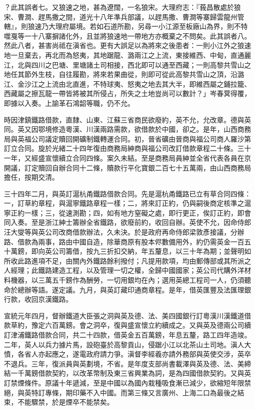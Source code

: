 \begin{pinyinscope}
？此其誤者七。又狼速之地，甚為遼闊，一名狼宋。大理府志：『莪昌散處於狼宋、曹澗、趕馬撒之間，道光十八年準兵部議，以趕馬撒、曹澗等寨歸雲龍州管轄』，則狼速乃大理府屬境。若如石道所勘，另尋一小江源至板廠山為界，則不特噬戛等一十八寨摒諸化外，且並將狼速地一帶地方亦概棄之不問矣。此其誤者八。然此八者，甚害尚祗在滇省也。更有大誤足以為將來之後患者：一則小江外之狼速地一旦棄去，再北而為怒夷，其地踞龍、潞兩江之上流，東接維西、中甸，直通麗江，北與四川之巴塘、里塘諸土司相接，西北即可以通至西藏；一則高黎共雪山之地任其節外生枝，自往履勘，將來若果曲從，則即可從此高黎共雪山之頂，沿潞江、金沙江之上流由北直進，不特球夷、怒夷之地去其大半，即維西屬之鋪拉籠、西藏屬之擦瓦龍一帶皆將被其所侵占，所失之土地豈尚可以數計？」岑春蓂得覆，即據以入奏。上諭革石鴻韶等職，仍不允。

時因津鎮鐵路借款，直隸、山東、江蘇三省商民欲廢約，英不允，允改章。德與英同。英又因鄂境修造粵漢、川漢兩路需款，欲借款於中國，卻之。是年，山西商務局與英福公司議定贖回開礦制鐵轉運合同。初，晉省礦由晉商與福公司商人羅沙第訂立合同。旋於光緒二十四年復由商務局紳商與福公司改訂借款章程二十條。三十一年，又經盛宣懷續立合同四條。案久未結。至是商務局員紳並全省代表各員在京開議，訂定贖回自辦合同十二條，贖款行平化寶銀二百七十五萬兩，由山西商務局擔任，按期交清。

三十四年二月，與英訂滬杭甬鐵路借款合同。先是滬杭甬鐵路已立有草合同四條：一，訂草約章程，與滬寧鐵路章程一樣；二，將來訂正約，仍與嗣後商定核準之滬寧正約一樣；三，從速測勘；四，如有地方窒礙之處，即行更正，俟訂正約，即會同入奏。至是浙江紳士籌辦全省鐵路，欲廢前約，收回自辦。英使不允，因命侍郎汪大燮等與英公司改商借款辦法，久未決。於是政府再命侍郎梁敦彥接議，分辦路、借款為兩事，路由中國自造，除華商原有股本侭數備用外，約仍需英金一百五十萬鎊，即向英公司籌借，按九三折扣交納，年五釐息，以三十年為期；並聲明如所收此路進項不足，由關內外鐵路餘利撥付；凡提用款項，均由郵傳部或其所派之人經理；此鐵路建造工程，以及管理一切之權，全歸中國國家；英公司代購外洋材料機器，以三萬五千鎊作為酬勞，一切用銀均在內；選用英總工程司一人，仍須聽命於總辦等語。遂定議。九月，與英訂藏印通商章程。是年，借英匯豐及法匯理銀行款，收回京漢鐵路。

宣統元年四月，督辦鐵道大臣張之洞與英及德、法、美四國銀行訂粵漢川漢鐵道借款草約，豫定六百萬鎊。會之洞卒，復與盛宣懷立約續成之。又與英及德兩公司續訂津浦鐵路借款合同，共二十四款，借英金五百萬鎊，年息五釐，路工四年造竣。二年，英人以兵力據片馬，設砲臺於高黎貢山，侵踞小江以北茶山土司地。滇人大憤，各省人亦起應之，遂電政府請力爭。滇督李經羲亦請外務部與英使交涉，英卒不退兵。三年，復派員與英劃境，不省。是年度支部尚書載澤與英及德、法、美締結一千萬鎊借款契約，以改革幣制及東三省興業為詞，是為四國借款契約。又與英訂禁煙條件。原議十年遞減，至是中國以為國內栽種吸食漸已減少，欲縮短年限禁絕，與英特訂專條，期印藥不入中國。而第三條又言廣州、上海二口為最後之結束，不能驟禁，於是煙卒不能禁矣。


\end{pinyinscope}